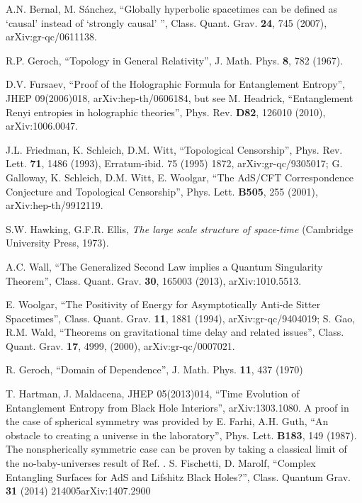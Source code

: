 \documentclass{article}
\begin{document}
\begin{thebibliography}{99}
A.N. Bernal, M. S\'{a}nchez, ``Globally hyperbolic spacetimes can be defined as 
`causal' instead of `strongly causal' '', Class. Quant. Grav. \textbf{24}, 745 (2007), arXiv:gr-qc/0611138. 

R.P. Geroch, ``Topology in General Relativity'', J. Math. Phys. \textbf{8}, 782 (1967).

D.V. Fursaev, ``Proof of the Holographic Formula for Entanglement Entropy'', JHEP 09(2006)018, arXiv:hep-th/0606184, but see 
M. Headrick, ``Entanglement Renyi entropies in holographic theories'', Phys. Rev. \textbf{D82}, 126010 (2010), 	arXiv:1006.0047.

J.L. Friedman, K. Schleich, D.M. Witt, ``Topological Censorship'', Phys. Rev. Lett. \textbf{71}, 1486 (1993), Erratum-ibid. 75 (1995) 1872, arXiv:gr-qc/9305017; G. Galloway, K. Schleich, D.M. Witt, E. Woolgar, ``The AdS/CFT Correspondence Conjecture and Topological Censorship'', Phys. Lett. \textbf{B505}, 255 (2001), arXiv:hep-th/9912119.

S.W. Hawking, G.F.R. Ellis, \textit{The large scale structure of space-time} (Cambridge University Press, 1973).

A.C. Wall, ``The Generalized Second Law implies a Quantum Singularity Theorem'', Class. Quant. Grav. \textbf{30}, 165003 (2013), arXiv:1010.5513.

E. Woolgar, ``The Positivity of Energy for Asymptotically Anti-de Sitter Spacetimes'', Class. Quant. Grav. \textbf{11}, 1881 (1994),  arXiv:gr-qc/9404019;
S. Gao, R.M. Wald, ``Theorems on gravitational time delay and related issues'',  Class. Quant. Grav. \textbf{17}, 4999, (2000), arXiv:gr-qc/0007021.


R. Geroch, ``Domain of Dependence'', J. Math. Phys. \textbf{11}, 437 (1970)

T. Hartman, J. Maldacena, JHEP 05(2013)014, ``Time Evolution of Entanglement Entropy from Black Hole Interiors'', 
arXiv:1303.1080.
A proof in the case of spherical symmetry was provided by E. Farhi, A.H. Guth, ``An obstacle to creating a universe in the laboratory'', Phys. Lett. \textbf{B183}, 149 (1987).  The nonspherically symmetric case can be proven by taking a classical limit of the no-baby-universes result of Ref. \cite{sing}.
S. Fischetti, D. Marolf, ``Complex Entangling Surfaces for AdS and Lifshitz Black Holes?'', Class. Quantum Grav. \textbf{31} (2014) 214005arXiv:1407.2900


\end{thebibliography}
\end{document}
